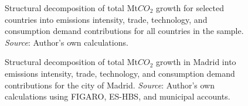 \documentclass[
  10pt,
  twocolumn]{aft}
\begin{document}
\begin{figure}


\caption{\label{fig-sda-decomposition-cou}Structural decomposition of
total Mt\(CO_2\) growth for selected countries into emissions intensity,
trade, technology, and consumption demand contributions for all
countries in the sample. \emph{Source}: Author's own calculations.}

\end{figure}%
\begin{figure}


\caption{\label{fig-sda-decomposition}Structural decomposition of total
Mt\(CO_2\) growth in Madrid into emissions intensity, trade, technology,
and consumption demand contributions for the city of Madrid.
\emph{Source}: Author's own calculations using FIGARO, ES-HBS, and
municipal accounts.}

\end{figure}%
\end{document}
